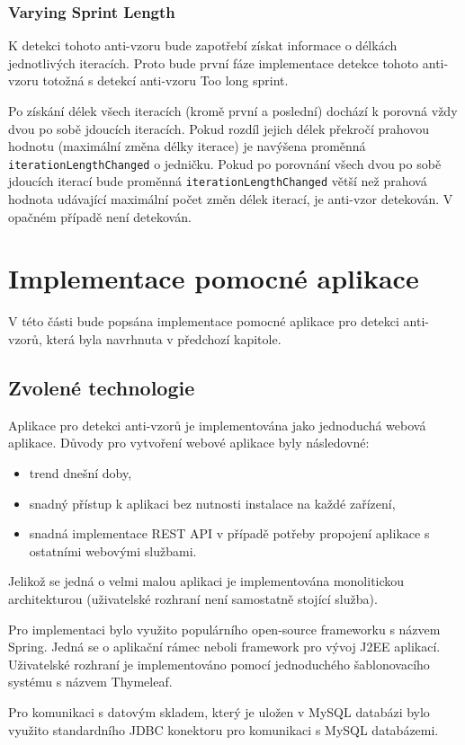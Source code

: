 \documentclass[czech,DP]{thesiskiv}
\begin{document}
\subsubsection{Varying Sprint Length}
K detekci tohoto anti-vzoru bude zapotřebí získat informace o délkách jednotlivých iteracích. Proto bude první fáze implementace detekce tohoto anti-vzoru totožná s detekcí anti-vzoru Too long sprint.
\par
Po získání délek všech iteracích (kromě první a poslední) dochází k porovná vždy dvou po sobě jdoucích iteracích. Pokud rozdíl jejich délek překročí prahovou hodnotu (maximální změna délky iterace) je navýšena proměnná \texttt{iterationLengthChanged} o jedničku. Pokud po porovnání všech dvou po sobě jdoucích iterací bude proměnná \texttt{iterationLengthChanged} větší než prahová hodnota udávající maximální počet změn délek iterací, je anti-vzor detekován. V opačném případě není detekován.
\section{Implementace pomocné aplikace}
V této části bude popsána implementace pomocné aplikace pro detekci anti-vzorů, která byla navrhnuta v předchozí kapitole.
\subsection{Zvolené technologie}
Aplikace pro detekci anti-vzorů je implementována jako jednoduchá webová aplikace. Důvody pro vytvoření webové aplikace byly následovné:
\begin{itemize}
    \item trend dnešní doby,
    \item snadný přístup k aplikaci bez nutnosti instalace na každé zařízení,
    \item snadná implementace REST API v případě potřeby propojení aplikace s ostatními webovými službami. 
\end{itemize}
Jelikož se jedná o velmi malou aplikaci je implementována monolitickou architekturou (uživatelské rozhraní není samostatně stojící služba).
\par
Pro implementaci bylo využito populárního open-source frameworku s názvem Spring. Jedná se o aplikační rámec neboli framework pro vývoj J2EE aplikací. Uživatelské rozhraní je implementováno pomocí jednoduchého šablonovacího systému s názvem Thymeleaf.
\par
Pro komunikaci s datovým skladem, který je uložen v MySQL databázi bylo využito standardního JDBC konektoru pro komunikaci s MySQL databázemi.
\end{document}
